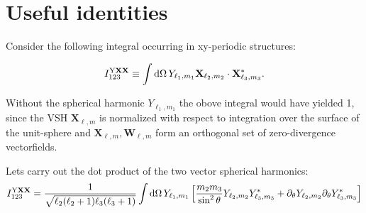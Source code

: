 \section{Useful identities}

Consider the following integral occurring in xy-periodic structures:

\begin{equation}
I^{\mathrm{Y\mathbf{X}\mathbf{X}}}_{123} \equiv \int \mathrm{d} \Omega \, Y_{\ell_1, m_1} \mathbf{X}_{\ell_2, m_2}\cdot \mathbf{X}^*_{\ell_3,m_3}.
\label{eqn:YXX_integral}
\end{equation}

Without the spherical harmonic $Y_{\ell_1,m_1}$ the obove integral would have yielded
1, since the VSH $\mathbf{X}_{\ell, m}$ is normalized with respect to integration over the surface of the unit-sphere and $\mathbf{X}_{\ell,m},\mathbf{W}_{\ell,m}$ form an orthogonal set of zero-divergence vectorfields. 

Lets carry out the dot product of the two vector spherical harmonics:
\begin{equation}
I^{\mathrm{Y\mathbf{X}\mathbf{X}}}_{123} =\frac{1}{\sqrt{\ell_2(\ell_2+1)\ell_3(\ell_3+1)}}\int \mathrm{d} \Omega\, 
Y_{\ell_1,m_1}\left[
\frac{m_2 m_3}{\sin^2\theta} Y_{\ell_2,m_2} Y^*_{\ell_3, m_3}
+\partial_\theta Y_{\ell_2,m_2}\partial_\theta Y^*_{\ell_3,m_3}
\right]
\label{eqn:YXX_integral_split}
\end{equation}
